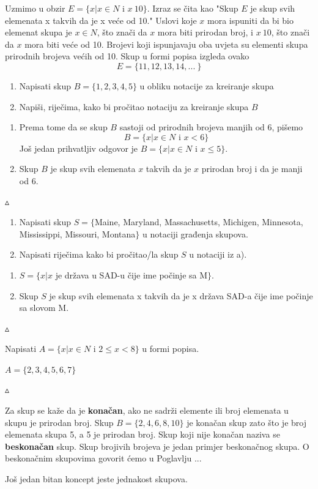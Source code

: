 \documentclass[a4paper,14pt,svgnames]{article}
\newcounter{counter}
\newcommand{\examplecounter}{\textbf{\refstepcounter{counter}PRIMJER \thecounter}}
\newcommand{\example}[3]{\begin{tcolorbox}[title=\large \examplecounter \hfill\small\textbf{"#1"}]
#2
\begin{tcolorbox}[title=\small \textbf{RJEŠENJE},colback=white]
\begin{center}
#3

\vspace{0.5em}\hfill $\vartriangle$
\end{center}
\end{tcolorbox}
\end{tcolorbox}}
\begin{document}
Uzmimo u obzir $E=\{x|x\in N$ i $x\>10\}$. Izraz se čita kao "Skup $E$ je skup svih elemenata x takvih da je x veće od 10." Uslovi koje $x$ mora ispuniti da bi bio elemenat skupa je $x\in N$, što znači da $x$ mora biti prirodan broj, i $x\> 10$, što znači da $x$ mora biti veće od 10. Brojevi koji ispunjavaju oba uvjeta su elementi skupa prirodnih brojeva većih od 10. Skup u formi popisa izgleda ovako
$$E=\{11, 12, 13, 14, ...\ \}$$

\example{Korištenje notacije za kreiranje skupova}{\begin{enumerate}[label=\alph*),leftmargin=0.5cm]
\item Napisati skup $B=\{1, 2, 3, 4, 5\}$ u obliku notacije za kreiranje skupa
\item Napiši, riječima, kako bi pročitao notaciju za kreiranje skupa $B$
\end{enumerate}}{\begin{enumerate}[label=\alph*),leftmargin=0.5cm]
\item Prema tome da se skup $B$ sastoji od prirodnih brojeva manjih od 6, pišemo $$B=\{x|x\in N\text { i } x< 6\}$$ Još jedan prihvatljiv odgovor je $B=\{x|x\in N$ i $x\leqslant 5\}$.
\item Skup $B$ je skup svih elemenata $x$ takvih da je $x$ prirodan broj i da je manji od 6.
\end{enumerate}}\medskip

\example{Forma popisa u notaciji građenja skupova}{\begin{enumerate}[label=\alph*),leftmargin=0.5cm]
\item Napisati skup $S = \{$Maine, Maryland, Massachusetts, Michigen, Minnesota, Mississippi, Missouri, Montana$\}$ u notaciji građenja skupova.
\item Napisati riječima kako bi pročitao/la skup $S$ u notaciji iz a).
\end{enumerate}}{\begin{enumerate}[label=\alph*),leftmargin=0.5cm]
\item $S=\{x|x$ je država u SAD-u čije ime počinje sa M$\}$.
\item Skup $S$ je skup svih elemenata x takvih da je x država SAD-a čije ime počinje sa slovom M.
\end{enumerate}}\medskip

\example{Notacija građenja skupova u formi popisa}{Napisati $A=\{x|x\in N$ i $2\leqslant x<8\}$ u formi popisa.}{$A=\{2, 3, 4, 5, 6, 7\}$}\medskip

Za skup se kaže da je \textbf{konačan}, ako ne sadrži elemente ili broj elemenata u skupu je prirodan broj. Skup $B=\{2, 4, 6, 8, 10\}$ je konačan skup zato što je broj elemenata skupa 5, a 5 je prirodan broj. Skup koji nije konačan naziva se \textbf{beskonačan} skup. Skup brojivih brojeva je jedan primjer beskonačnog skupa. O beskonačnim skupovima govorit ćemo u Poglavlju ...\par\smallskip
Još jedan bitan koncept jeste jednakost skupova.\smallskip
\end{document}
